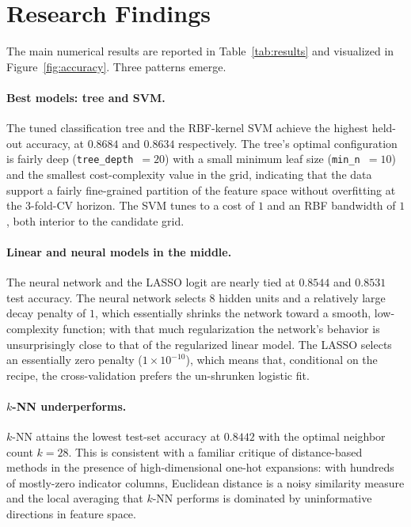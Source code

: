 \documentclass[12pt,english]{article}
\begin{document}
\section{Research Findings}\label{sec:results}

The main numerical results are reported in Table~\ref{tab:results} and
visualized in Figure~\ref{fig:accuracy}. Three patterns emerge.

\paragraph{Best models: tree and SVM.}
The tuned classification tree and the RBF-kernel SVM achieve the highest
held-out accuracy, at $0.8684$ and $0.8634$ respectively. The tree's
optimal configuration is fairly deep (\texttt{tree\_depth}~$= 20$) with a
small minimum leaf size (\texttt{min\_n}~$=10$) and the smallest
cost-complexity value in the grid, indicating that the data support a
fairly fine-grained partition of the feature space without overfitting at
the 3-fold-CV horizon. The SVM tunes to a cost of $1$ and an RBF
bandwidth of $1$, both interior to the candidate grid.

\paragraph{Linear and neural models in the middle.}
The neural network and the LASSO logit are nearly tied at
$0.8544$ and $0.8531$ test accuracy. The neural network selects 8 hidden
units and a relatively large decay penalty of $1$, which essentially
shrinks the network toward a smooth, low-complexity function; with that
much regularization the network's behavior is unsurprisingly close to
that of the regularized linear model. The LASSO selects an essentially
zero penalty ($1\times 10^{-10}$), which means that, conditional on the
recipe, the cross-validation prefers the un-shrunken logistic fit.

\paragraph{$k$-NN underperforms.}
$k$-NN attains the lowest test-set accuracy at $0.8442$ with the optimal
neighbor count $k=28$. This is consistent with a familiar critique of
distance-based methods in the presence of high-dimensional one-hot
expansions: with hundreds of mostly-zero indicator columns, Euclidean
distance is a noisy similarity measure and the local averaging that
$k$-NN performs is dominated by uninformative directions in feature
space.
\end{document}
